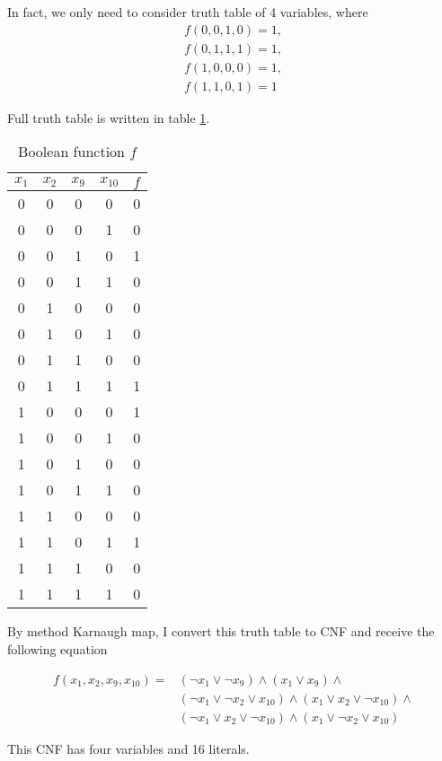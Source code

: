 \documentclass{article}
\begin{document}
In fact, we only need to consider truth table of 4 variables, where 
\begin{align*}
    f(0, 0, 1, 0) = 1, \\
    f(0, 1, 1, 1) = 1, \\
    f(1, 0, 0, 0) = 1, \\
    f(1, 1, 0, 1) = 1
\end{align*}

Full truth table is written in table \ref{func}.

\begin{table}[htb]
    \centering
    \begin{tabular}{|c|c|c|c|c|}
        \hline
        $x_1$ & $x_2$ & $x_9$ & $x_{10}$ & $f$ \\
        \hline
        0 & 0 & 0 & 0 & 0 \\
        \hline
        0 & 0 & 0 & 1 & 0 \\
        \hline
        0 & 0 & 1 & 0 & 1 \\
        \hline
        0 & 0 & 1 & 1 & 0 \\
        \hline
        0 & 1 & 0 & 0 & 0 \\
        \hline
        0 & 1 & 0 & 1 & 0 \\
        \hline
        0 & 1 & 1 & 0 & 0 \\
        \hline
        0 & 1 & 1 & 1 & 1 \\
        \hline
        1 & 0 & 0 & 0 & 1 \\
        \hline
        1 & 0 & 0 & 1 & 0 \\
        \hline
        1 & 0 & 1 & 0 & 0 \\
        \hline
        1 & 0 & 1 & 1 & 0 \\
        \hline
        1 & 1 & 0 & 0 & 0 \\
        \hline
        1 & 1 & 0 & 1 & 1 \\
        \hline
        1 & 1 & 1 & 0 & 0 \\
        \hline
        1 & 1 & 1 & 1 & 0 \\
        \hline
    \end{tabular}
    \caption{Boolean function $f$}
    \label{func}
\end{table}

By method Karnaugh map, I convert this truth table to CNF and receive the following equation

\begin{align*}
    f(x_1, x_2, x_9, x_{10}) = & (\lnot x_1 \lor \lnot x_9) \land (x_1 \lor x_9) \land \\ 
    & (\lnot x_1 \lor \lnot x_2 \lor x_{10}) \land (x_1 \lor x_2 \lor \lnot x_{10}) \land \\
    & (\lnot x_1 \lor x_2 \lor \lnot x_{10}) \land (x_1 \lor \lnot x_2 \lor x_{10})
\end{align*}

This CNF has four variables and 16 literals.
\end{document}
